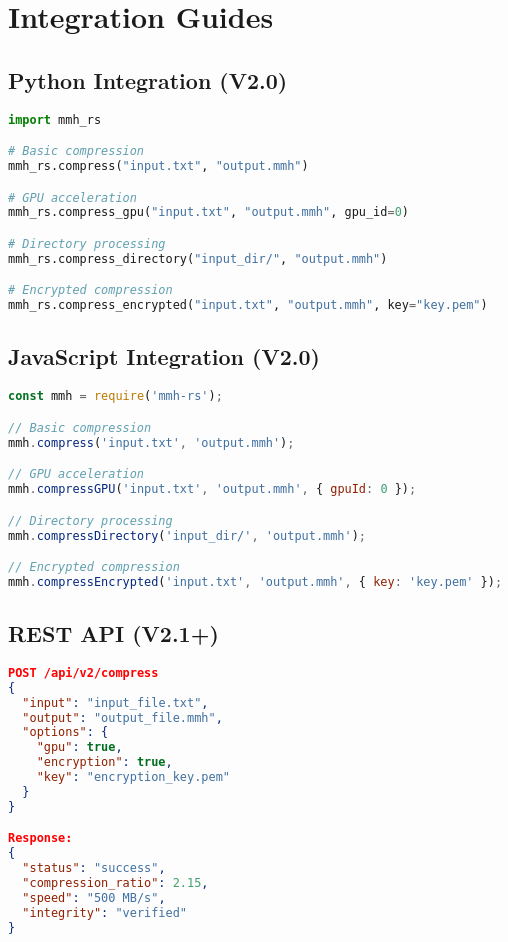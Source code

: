 \documentclass[12pt,a4paper]{article}
\begin{document}
\section{Integration Guides}

\subsection{Python Integration (V2.0)}
\begin{lstlisting}[language=Python, caption=Python Integration Example]
import mmh_rs

# Basic compression
mmh_rs.compress("input.txt", "output.mmh")

# GPU acceleration
mmh_rs.compress_gpu("input.txt", "output.mmh", gpu_id=0)

# Directory processing
mmh_rs.compress_directory("input_dir/", "output.mmh")

# Encrypted compression
mmh_rs.compress_encrypted("input.txt", "output.mmh", key="key.pem")
\end{lstlisting}

\subsection{JavaScript Integration (V2.0)}
\begin{lstlisting}[language=JavaScript, caption=JavaScript Integration Example]
const mmh = require('mmh-rs');

// Basic compression
mmh.compress('input.txt', 'output.mmh');

// GPU acceleration
mmh.compressGPU('input.txt', 'output.mmh', { gpuId: 0 });

// Directory processing
mmh.compressDirectory('input_dir/', 'output.mmh');

// Encrypted compression
mmh.compressEncrypted('input.txt', 'output.mmh', { key: 'key.pem' });
\end{lstlisting}

\subsection{REST API (V2.1+)}
\begin{lstlisting}[language=JSON, caption=REST API Example]
POST /api/v2/compress
{
  "input": "input_file.txt",
  "output": "output_file.mmh",
  "options": {
    "gpu": true,
    "encryption": true,
    "key": "encryption_key.pem"
  }
}

Response:
{
  "status": "success",
  "compression_ratio": 2.15,
  "speed": "500 MB/s",
  "integrity": "verified"
}
\end{lstlisting}
\end{document}
